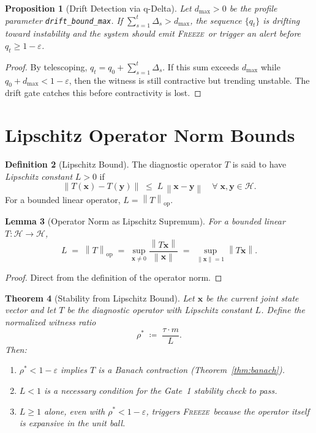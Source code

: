 \documentclass[11pt,a4paper]{article}
\theoremstyle{tealstyle}
\newtheorem{theorem}{Theorem}[section]
\newtheorem{lemma}[theorem]{Lemma}
\newtheorem{proposition}[theorem]{Proposition}
\theoremstyle{definition}
\newtheorem{definition}[theorem]{Definition}
\newcommand{\Hilb}{\mathcal{H}}
\newcommand{\norm}[1]{\left\lVert #1 \right\rVert}
\newcommand{\eps}{\varepsilon}
\newcommand{\qwit}{q}
\newcommand{\Tau}{\tau}
\newcommand{\freeze}{\textsc{Freeze}}
\begin{document}
\begin{proposition}[Drift Detection via q-Delta]
\label{prop:drift}
Let $d_{\max} > 0$ be the profile parameter \texttt{drift\_bound\_max}.
If $\sum_{s=1}^{t} \Delta_s > d_{\max}$, the sequence $\{\qwit_t\}$ is
drifting toward instability and the system should emit \freeze\ or trigger
an alert before $\qwit_t \ge 1 - \eps$.
\end{proposition}

\begin{proof}
By telescoping, $\qwit_t = \qwit_0 + \sum_{s=1}^{t} \Delta_s$.
If this sum exceeds $d_{\max}$ while $\qwit_0 + d_{\max} < 1 - \eps$,
then the witness is still contractive but trending unstable.
The drift gate catches this before contractivity is lost.
\end{proof}

\section{Lipschitz Operator Norm Bounds}
\label{sec:lipschitz}

\begin{definition}[Lipschitz Bound]
\label{def:lipschitz}
The diagnostic operator $T$ is said to have \emph{Lipschitz constant} $L > 0$
if
\begin{equation}
  \label{eq:lipschitz}
  \norm{T(\bm{x}) - T(\bm{y})} \;\le\; L\,\norm{\bm{x} - \bm{y}}
  \quad \forall\; \bm{x}, \bm{y} \in \Hilb.
\end{equation}
For a bounded linear operator, $L = \norm{T}_{\mathrm{op}}$.
\end{definition}

\begin{lemma}[Operator Norm as Lipschitz Supremum]
\label{lem:op-norm}
For a bounded linear $T\colon \Hilb \to \Hilb$,
\[
  L \;=\; \norm{T}_{\mathrm{op}}
    \;=\; \sup_{\bm{x} \ne 0} \frac{\norm{T\bm{x}}}{\norm{\bm{x}}}
    \;=\; \sup_{\norm{\bm{x}}=1} \norm{T\bm{x}}.
\]
\end{lemma}

\begin{proof}
Direct from the definition of the operator norm.
\end{proof}

\begin{theorem}[Stability from Lipschitz Bound]
\label{thm:stability}
Let $\bm{x}$ be the current joint state vector and let
$T$ be the diagnostic operator with Lipschitz constant $L$.
Define the \emph{normalized witness ratio}
\[
  \rho^* \;\coloneqq\; \frac{\Tau \cdot m}{L}.
\]
Then:
\begin{enumerate}[label=(\roman*)]
  \item $\rho^* < 1 - \eps$ implies $T$ is a Banach contraction
    (Theorem~\ref{thm:banach}).
  \item $L < 1$ is a necessary condition for the Gate~1 stability check
    to pass.
  \item $L \ge 1$ alone, even with $\rho^* < 1 - \eps$, triggers \freeze\
    because the operator itself is expansive in the unit ball.
\end{enumerate}
\end{theorem}
\end{document}
